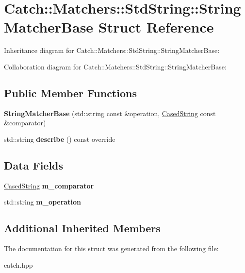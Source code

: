\hypertarget{structCatch_1_1Matchers_1_1StdString_1_1StringMatcherBase}{}\section{Catch\+:\+:Matchers\+:\+:Std\+String\+:\+:String\+Matcher\+Base Struct Reference}
\label{structCatch_1_1Matchers_1_1StdString_1_1StringMatcherBase}


Inheritance diagram for Catch\+:\+:Matchers\+:\+:Std\+String\+:\+:String\+Matcher\+Base\+:


Collaboration diagram for Catch\+:\+:Matchers\+:\+:Std\+String\+:\+:String\+Matcher\+Base\+:
\subsection*{Public Member Functions}
\begin{DoxyCompactItemize}
\item 
\mbox{\label{structCatch_1_1Matchers_1_1StdString_1_1StringMatcherBase_a3a9b66bae298ae27058478529b4bb39d}} 
{\bfseries String\+Matcher\+Base} (std\+::string const \&operation, \hyperlink{structCatch_1_1Matchers_1_1StdString_1_1CasedString}{Cased\+String} const \&comparator)
\item 
\mbox{\label{structCatch_1_1Matchers_1_1StdString_1_1StringMatcherBase_a47af030f8cea42a601ffb1000eea5cca}} 
std\+::string {\bfseries describe} () const override
\end{DoxyCompactItemize}
\subsection*{Data Fields}
\begin{DoxyCompactItemize}
\item 
\mbox{\label{structCatch_1_1Matchers_1_1StdString_1_1StringMatcherBase_a17c9f0fe40587070ffe998c193742831}} 
\hyperlink{structCatch_1_1Matchers_1_1StdString_1_1CasedString}{Cased\+String} {\bfseries m\+\_\+comparator}
\item 
\mbox{\label{structCatch_1_1Matchers_1_1StdString_1_1StringMatcherBase_a7a25c4b7d863e9a1c406d81efd0f83ca}} 
std\+::string {\bfseries m\+\_\+operation}
\end{DoxyCompactItemize}
\subsection*{Additional Inherited Members}


The documentation for this struct was generated from the following file\+:\begin{DoxyCompactItemize}
\item 
catch.\+hpp\end{DoxyCompactItemize}
